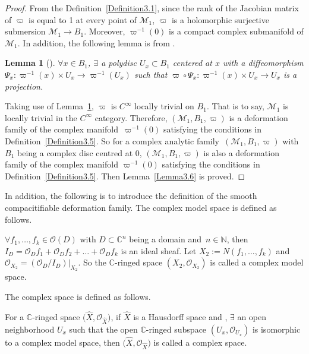 \documentclass[10pt,a4paper]{amsart}
\numberwithin{equation}{section}
\newtheorem{Lemma}[Theorem]{Lemma}
\begin{document}
\begin{proof}
From the Definition~\ref{Definition3.1}, since the rank of the Jacobian matrix of $\varpi$ is equal to 1 at every point of $\mathcal{M}_1$, $\varpi$ is a holomorphic surjective submersion $\mathcal{M}_1 \rightarrow B_1$. Moreover, $\varpi^{-1}(0)$ is a compact complex submanifold of $\mathcal{M}_1$. In addition, the following lemma is from \cite{Kunihiko}.

\begin{Lemma}[{\cite[Theorem~2.5]{Kunihiko}}] \label{Lemma3.7} $\forall x \in B_1$, $\exists$ a polydisc $U_x \subset B_1$ centered at $x$ with a diffeomorphism $\Psi_x \colon \varpi^{-1}(x) \times U_x \rightarrow \varpi^{-1}(U_x)$ such that $\varpi \circ \Psi_x \colon \varpi^{-1}(x) \times U_x \rightarrow U_x$ is a projection.
\end{Lemma}

Taking use of Lemma~\ref{Lemma3.7}, $\varpi$ is $C^\infty$ locally trivial on $B_1$. That is to say, $\mathcal{M}_1$ is locally trivial in the $C^\infty$ category. Therefore, $(\mathcal{M}_1, B_1, \varpi)$ is a deformation family of the complex manifold~$\varpi^{-1}(0)$ satisfying the conditions in Definition~\ref{Definition3.5}. So for a complex analytic family~$(\mathcal{M}_1, B_1, \varpi)$ with $B_1$ being a complex disc centred at $0$, $(\mathcal{M}_1, B_1, \varpi)$ is also a deformation family of the complex manifold $\varpi^{-1}(0)$ satisfying the conditions in Definition~\ref{Definition3.5}. Then Lemma~\ref{Lemma3.6} is proved.
\end{proof}


In addition, the following is to introduce the definition of the smooth compacitifiable deformation family. The complex model space is defined as follows.

\begin{Definition} \label{Definition3.8}
$\forall f_1,\dots ,f_k \in \mathcal{O}(D)$ with $D \subset \mathbb{C}^n$ being a domain and~${n \in \mathbb{N}}$, then $I_D=\mathcal{O}_Df_1+\mathcal{O}_Df_2+\dots +\mathcal{O}_Df_k$ is an ideal sheaf. Let $X_2:=N(f_1,\dots ,f_k)$ and $\mathcal{O}_{X_2}=(\mathcal{O}_D/I_D)|_{X_2}$. So the $\mathbb{C}$-ringed space $(X_2,\mathcal{O}_{X_2})$ is called a complex model space.
\end{Definition}

The complex space is defined as follows.

\begin{Definition} \label{Definition3.9}
For a $\mathbb{C}$-ringed space $\bigl(\hat{X},\mathcal{O}_{\hat{X}}\bigr)$, if $\hat{X}$ is a Hausdorff space and , $\exists$ an open neighborhood $U_x$ such that the open $\mathbb{C}$-ringed subspace $(U_x,\mathcal{O}_{U_x})$ is isomorphic to a complex model space, then $\bigl(\hat{X},\mathcal{O}_{\hat{X}}\bigr)$ is called a complex space.
\end{Definition}
\end{document}
